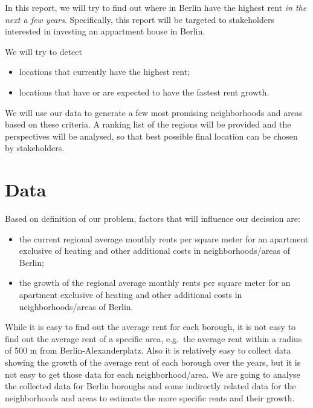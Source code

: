 \documentclass[11pt]{article}
\begin{document}
    In this report, we will try to find out where in Berlin have the highest
rent \emph{in the next a few years}. Specifically, this report will be
targeted to stakeholders interested in investing an appartment house in
Berlin.

We will try to detect 
\begin{itemize}
    \item locations that currently have the highest
        rent; 
    \item locations that have or are expected to have the
fastest rent growth.
\end{itemize}

We will use our data to generate a few most promising neighborhoods and
areas based on these criteria. A ranking list of the regions will be
provided and the perspectives will be analysed, so that best possible
final location can be chosen by stakeholders.

    \hypertarget{data}{%
\section{\texorpdfstring{Data }{Data }}\label{data}}

    Based on definition of our problem, factors that will influence our
decission are: 
\begin{itemize}
    \item the current regional average monthly rents per square
meter for an apartment exclusive of heating and other additional costs
in neighborhoods/areas of Berlin; 
\item the growth of the regional average
monthly rents per square meter for an apartment exclusive of heating and
other additional costs in neighborhoods/areas of Berlin.
\end{itemize}

While it is easy to find out the average rent for each borough, it is
not easy to find out the average rent of a specific area, e.g.~the
average rent within a radius of 500 m from Berlin-Alexanderplatz. Also
it is relatively easy to collect data showing the growth of the average
rent of each borough over the years, but it is not easy to get those
data for each neighborhood/area. We are going to analyse the collected
data for Berlin boroughs and some indirectly related data for the
neighborhoods and areas to estimate the more specific rents and their
growth.
\end{document}
